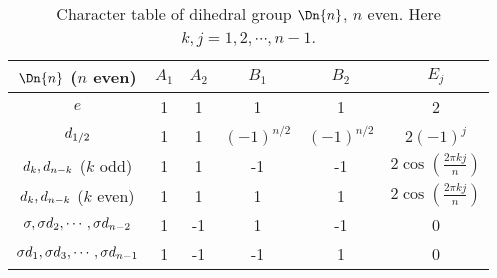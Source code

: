 \begin{table}[h]
  \caption{
    Character table of dihedral group $\Dn{n}$, $n$ even.
    Here $k,j=1,2,\cdots,n-1$.
  }
  \label{tab:DnEven}
  \begin{center}
    \begin{tabular}{c|ccccc}
      $\Dn{n}$ ($n$ even)  & $A_1$& $A_2$& $B_1$& $B_2$& $E_j$ \\
      \hline
      $  e  $        &   1  &   1  &  1   &  1   &  2  \\
      $d_{1/2}$
                           &   1  &   1  &  $(-1)^{n/2}$   & $(-1)^{n/2}$  & $2(-1)^{j}$ \\
      $d_{k},d_{n-k}$ ($k$ odd)
                           &   1  &   1  & -1   & -1
                                                       & $2\cos(\frac{2\pi kj}{n})$  \\
      $d_{k},d_{n-k}$ ($k$ even)
                           &   1  &   1  & 1   & 1
                                                       &  $2\cos(\frac{2\pi kj}{n})$  \\
      $\sigma,\sigma d_{2},\cdots,\sigma d_{n-2}$
                           &   1  &  -1  &  1   & -1   &  0  \\
      $\sigma d_{1},\sigma d_{3},\cdots,\sigma d_{n-1}$
                           &   1  &  -1  &  -1   & 1   &  0  \\
    \end{tabular}
  \end{center}
\end{table}
